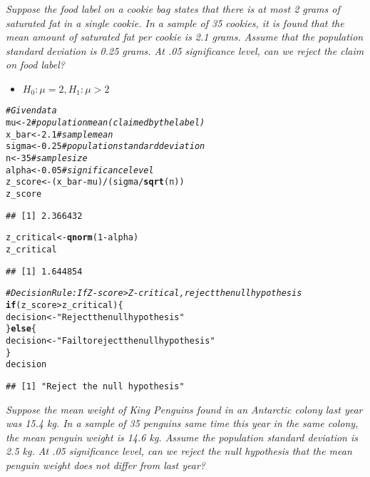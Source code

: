 \documentclass{article}\usepackage[]{graphicx}\usepackage[]{xcolor}
\makeatletter
\newcommand{\hlnum}[1]{\textcolor[rgb]{0.686,0.059,0.569}{#1}}%
\newcommand{\hlsng}[1]{\textcolor[rgb]{0.192,0.494,0.8}{#1}}%
\newcommand{\hlcom}[1]{\textcolor[rgb]{0.678,0.584,0.686}{\textit{#1}}}%
\newcommand{\hlopt}[1]{\textcolor[rgb]{0,0,0}{#1}}%
\newcommand{\hldef}[1]{\textcolor[rgb]{0.345,0.345,0.345}{#1}}%
\newcommand{\hlkwa}[1]{\textcolor[rgb]{0.161,0.373,0.58}{\textbf{#1}}}%
\newcommand{\hlkwb}[1]{\textcolor[rgb]{0.69,0.353,0.396}{#1}}%
\newcommand{\hlkwd}[1]{\textcolor[rgb]{0.737,0.353,0.396}{\textbf{#1}}}%
\newenvironment{kframe}{%
 \def\at@end@of@kframe{}%
 \ifinner\ifhmode%
  \def\at@end@of@kframe{\end{minipage}}%
  \begin{minipage}{\columnwidth}%
 \fi\fi%
 \def\FrameCommand##1{\hskip\@totalleftmargin \hskip-\fboxsep
 \colorbox{shadecolor}{##1}\hskip-\fboxsep
     \hskip-\linewidth \hskip-\@totalleftmargin \hskip\columnwidth}%
 \MakeFramed {\advance\hsize-\width
   \@totalleftmargin\z@ \linewidth\hsize
   \@setminipage}}%
 {\par\unskip\endMakeFramed%
 \at@end@of@kframe}
\newenvironment{knitrout}{}{} %
\makeatother
\begin{document}
\emph{Suppose the food label on a cookie bag states that there is at most 2 grams of
saturated fat in a single cookie. In a sample of 35 cookies, it is found that the mean
amount of saturated fat per cookie is 2.1 grams. Assume that the population
standard deviation is 0.25 grams. At .05 significance level, can we reject the claim
on food label?}\\
\begin{itemize}
  \item $H_0:\mu = 2, H_1: \mu >2$
\end{itemize}
\begin{knitrout}
\color{fgcolor}\begin{kframe}
\begin{alltt}
\hlcom{# Given data}
\hldef{mu} \hlkwb{<-} \hlnum{2}        \hlcom{# population mean (claimed by the label)}
\hldef{x_bar} \hlkwb{<-} \hlnum{2.1}   \hlcom{# sample mean}
\hldef{sigma} \hlkwb{<-} \hlnum{0.25}  \hlcom{# population standard deviation}
\hldef{n} \hlkwb{<-} \hlnum{35}        \hlcom{# sample size}
\hldef{alpha} \hlkwb{<-} \hlnum{0.05}  \hlcom{# significance level}
\hldef{z_score} \hlkwb{<-} \hldef{(x_bar} \hlopt{-} \hldef{mu)} \hlopt{/} \hldef{(sigma} \hlopt{/} \hlkwd{sqrt}\hldef{(n))}
\hldef{z_score}
\end{alltt}
\begin{verbatim}
## [1] 2.366432
\end{verbatim}
\begin{alltt}
\hldef{z_critical} \hlkwb{<-} \hlkwd{qnorm}\hldef{(}\hlnum{1} \hlopt{-} \hldef{alpha)}
\hldef{z_critical}
\end{alltt}
\begin{verbatim}
## [1] 1.644854
\end{verbatim}
\begin{alltt}
\hlcom{# Decision Rule: If Z-score > Z-critical, reject the null hypothesis}
\hlkwa{if} \hldef{(z_score} \hlopt{>} \hldef{z_critical) \{}
  \hldef{decision} \hlkwb{<-} \hlsng{"Reject the null hypothesis"}
\hldef{\}} \hlkwa{else} \hldef{\{}
  \hldef{decision} \hlkwb{<-} \hlsng{"Fail to reject the null hypothesis"}
\hldef{\}}
\hldef{decision}
\end{alltt}
\begin{verbatim}
## [1] "Reject the null hypothesis"
\end{verbatim}
\end{kframe}
\end{knitrout}
\emph{Suppose the mean weight of King Penguins found in an Antarctic colony last year
was 15.4 kg. In a sample of 35 penguins same time this year in the same colony,
the mean penguin weight is 14.6 kg. Assume the population standard deviation is
2.5 kg. At .05 significance level, can we reject the null hypothesis that the mean
penguin weight does not differ from last year?}\\
\end{document}
